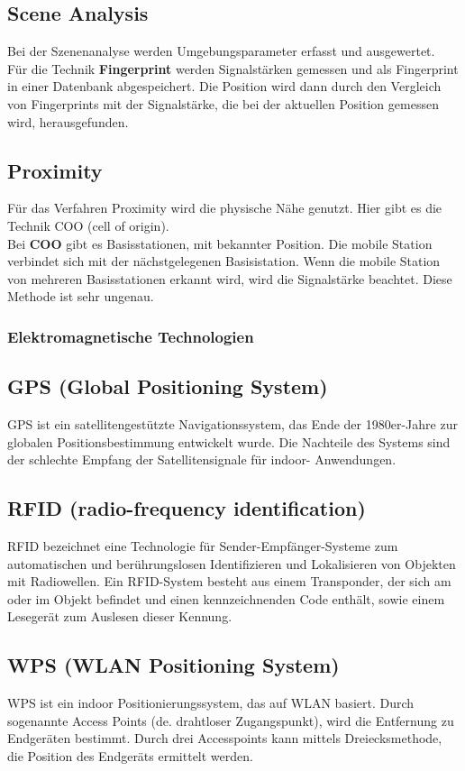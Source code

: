     \subsection*{Scene Analysis}
    Bei der Szenenanalyse werden Umgebungsparameter erfasst und ausgewertet.\\
    Für die Technik \textbf{Fingerprint} werden Signalstärken gemessen und als Fingerprint in einer Datenbank abgespeichert. Die Position wird dann durch den Vergleich von Fingerprints mit der Signalstärke, die bei der aktuellen Position gemessen wird, herausgefunden.
    \subsection*{Proximity}
    Für das Verfahren Proximity wird die physische Nähe genutzt.
    Hier gibt es die Technik COO (cell of origin). \\
    Bei \textbf{COO} gibt es Basisstationen, mit bekannter Position. Die mobile Station verbindet sich mit der nächstgelegenen Basisistation. Wenn die mobile Station von mehreren Basisstationen erkannt wird, wird die Signalstärke beachtet. Diese Methode ist sehr ungenau.
    \\ %

    \subsubsection{Elektromagnetische Technologien}
    \subsection*{GPS (Global Positioning System)}
    GPS ist ein satellitengestützte Navigationssystem, das Ende der 1980er-Jahre zur globalen Positionsbestimmung entwickelt wurde. Die Nachteile des Systems sind der schlechte Empfang der Satellitensignale für indoor- Anwendungen. 
    \subsection*{RFID (radio-frequency identification)}
    RFID bezeichnet eine Technologie für Sender-Empfänger-Systeme zum automatischen und berührungslosen Identifizieren und Lokalisieren von Objekten mit Radiowellen. Ein RFID-System besteht aus einem Transponder, der sich am oder im Objekt befindet und einen kennzeichnenden Code enthält, sowie einem Lesegerät zum Auslesen dieser Kennung. 
    \subsection*{WPS (WLAN Positioning System)}   
    WPS ist ein indoor Positionierungssystem, das auf WLAN basiert. Durch sogenannte  Access Points (de. drahtloser Zugangspunkt), wird die Entfernung zu Endgeräten bestimmt. Durch drei Accesspoints kann mittels Dreiecksmethode, die Position des Endgeräts ermittelt werden.

